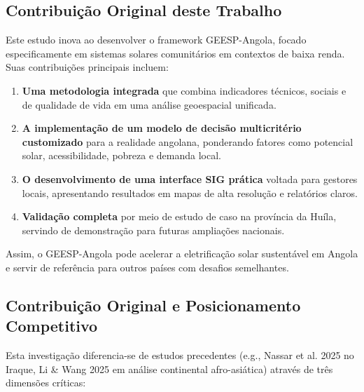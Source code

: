 \documentclass[12pt, a4paper]{article}
\begin{document}
\subsection{Contribuição Original deste Trabalho}

Este estudo inova ao desenvolver o framework GEESP-Angola, focado especificamente em sistemas solares comunitários em contextos de baixa renda. Suas contribuições principais incluem:

\begin{enumerate}
\item \textbf{Uma metodologia integrada} que combina indicadores técnicos, sociais e de qualidade de vida em uma análise geoespacial unificada.
\item \textbf{A implementação de um modelo de decisão multicritério customizado} para a realidade angolana, ponderando fatores como potencial solar, acessibilidade, pobreza e demanda local.
\item \textbf{O desenvolvimento de uma interface SIG prática} voltada para gestores locais, apresentando resultados em mapas de alta resolução e relatórios claros.
\item \textbf{Validação completa} por meio de estudo de caso na província da Huíla, servindo de demonstração para futuras ampliações nacionais.
\end{enumerate}

Assim, o GEESP-Angola pode acelerar a eletrificação solar sustentável em Angola e servir de referência para outros países com desafios semelhantes.

\subsection{Contribuição Original e Posicionamento Competitivo}

Esta investigação diferencia-se de estudos precedentes (e.g., Nassar et al. 2025 no Iraque, Li \& Wang 2025 em análise continental afro-asiática) através de três dimensões críticas:
\end{document}
